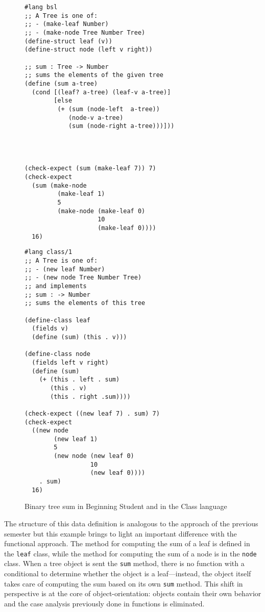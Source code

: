 \documentclass[submission,copyright]{eptcs}
\begin{document}
\begin{figure}[h!]
\begin{minipage}[t]{3.5in}
\begin{verbatim}
#lang bsl
;; A Tree is one of:
;; - (make-leaf Number)
;; - (make-node Tree Number Tree)
(define-struct leaf (v))
(define-struct node (left v right))

;; sum : Tree -> Number
;; sums the elements of the given tree
(define (sum a-tree)
  (cond [(leaf? a-tree) (leaf-v a-tree)]
        [else
         (+ (sum (node-left  a-tree))
            (node-v a-tree)
            (sum (node-right a-tree)))]))




(check-expect (sum (make-leaf 7)) 7)
(check-expect 
  (sum (make-node
         (make-leaf 1)
         5 
         (make-node (make-leaf 0)
                    10
                    (make-leaf 0))))
  16)
\end{verbatim}
\end{minipage}
\begin{minipage}[t]{3in}
\begin{verbatim}
#lang class/1
;; A Tree is one of:
;; - (new leaf Number)
;; - (new node Tree Number Tree)
;; and implements
;; sum : -> Number
;; sums the elements of this tree

(define-class leaf
  (fields v)
  (define (sum) (this . v)))

(define-class node
  (fields left v right)
  (define (sum)
    (+ (this . left . sum)
       (this . v)
       (this . right .sum))))

(check-expect ((new leaf 7) . sum) 7)
(check-expect 
  ((new node
        (new leaf 1)
        5 
        (new node (new leaf 0) 
                  10
                  (new leaf 0))))
    . sum)
  16)
\end{verbatim}
\end{minipage}
\caption{Binary tree sum in Beginning Student and in the Class language}
\label{fig:tree}
\end{figure}

The structure of this data definition is analogous to the approach of
the previous semester but this example brings to light an important
difference with the functional approach.  The method for computing the
sum of a leaf is defined in the {\tt leaf} class, while the
method for computing the sum of a node is in the {\tt node} class.
When a tree object is sent the {\tt sum} method, there is no function
with a conditional to determine whether the object is a
leaf---instead, the object itself takes care of computing the sum
based on its own {\tt sum} method.  This shift in perspective
is at the core of object-orientation: objects contain their own
behavior and the case analysis previously done in functions is
eliminated.
\end{document}
